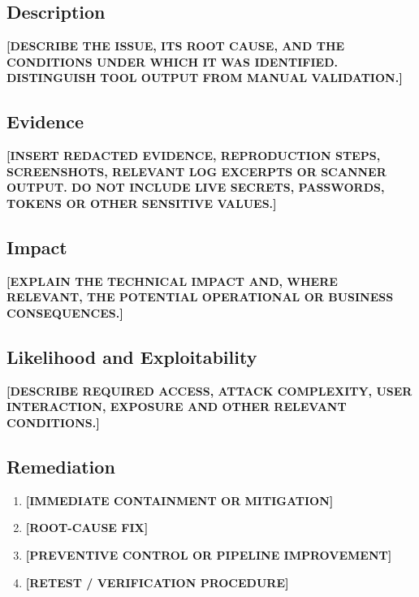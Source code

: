 \documentclass[11pt,a4paper]{report}
\newcommand{\placeholder}[1]{\textbf{[#1]}}
\begin{document}
\subsection{Description}
\placeholder{DESCRIBE THE ISSUE, ITS ROOT CAUSE, AND THE CONDITIONS UNDER
WHICH IT WAS IDENTIFIED. DISTINGUISH TOOL OUTPUT FROM MANUAL VALIDATION.}

\subsection{Evidence}
\placeholder{INSERT REDACTED EVIDENCE, REPRODUCTION STEPS, SCREENSHOTS,
RELEVANT LOG EXCERPTS OR SCANNER OUTPUT. DO NOT INCLUDE LIVE SECRETS,
PASSWORDS, TOKENS OR OTHER SENSITIVE VALUES.}



\subsection{Impact}
\placeholder{EXPLAIN THE TECHNICAL IMPACT AND, WHERE RELEVANT, THE
POTENTIAL OPERATIONAL OR BUSINESS CONSEQUENCES.}

\subsection{Likelihood and Exploitability}
\placeholder{DESCRIBE REQUIRED ACCESS, ATTACK COMPLEXITY, USER INTERACTION,
EXPOSURE AND OTHER RELEVANT CONDITIONS.}

\subsection{Remediation}
\begin{enumerate}
    \item \placeholder{IMMEDIATE CONTAINMENT OR MITIGATION}
    \item \placeholder{ROOT-CAUSE FIX}
    \item \placeholder{PREVENTIVE CONTROL OR PIPELINE IMPROVEMENT}
    \item \placeholder{RETEST / VERIFICATION PROCEDURE}
\end{enumerate}
\end{document}
